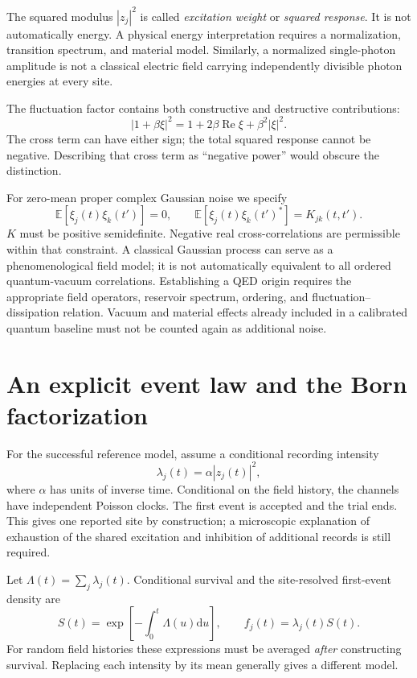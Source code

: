 \documentclass[11pt]{article}
\newcommand{\E}{\mathbb E}
\newcommand{\dd}{\mathrm d}
\begin{document}
The squared modulus $|z_j|^2$ is called \emph{excitation weight} or \emph{squared response}. It is not automatically energy. A physical energy interpretation requires a normalization, transition spectrum, and material model. Similarly, a normalized single-photon amplitude is not a classical electric field carrying independently divisible photon energies at every site.

The fluctuation factor contains both constructive and destructive contributions:
\begin{equation}
 |1+\beta\xi|^2=1+2\beta\operatorname{Re}\xi+\beta^2|\xi|^2.
\end{equation}
The cross term can have either sign; the total squared response cannot be negative. Describing that cross term as ``negative power'' would obscure the distinction.

For zero-mean proper complex Gaussian noise we specify
\begin{equation}
 \E[\xi_j(t)\xi_k(t')]=0,\qquad
 \E[\xi_j(t)\xi_k(t')^*]=K_{jk}(t,t').
\end{equation}
$K$ must be positive semidefinite. Negative real cross-correlations are permissible within that constraint. A classical Gaussian process can serve as a phenomenological field model; it is not automatically equivalent to all ordered quantum-vacuum correlations. Establishing a QED origin requires the appropriate field operators, reservoir spectrum, ordering, and fluctuation--dissipation relation. Vacuum and material effects already included in a calibrated quantum baseline must not be counted again as additional noise.

\section{An explicit event law and the Born factorization}
For the successful reference model, assume a conditional recording intensity
\begin{equation}\label{eq:hazard}
 \lambda_j(t)=\alpha |z_j(t)|^2,
\end{equation}
where $\alpha$ has units of inverse time. Conditional on the field history, the channels have independent Poisson clocks. The first event is accepted and the trial ends. This gives one reported site by construction; a microscopic explanation of exhaustion of the shared excitation and inhibition of additional records is still required.

Let $\Lambda(t)=\sum_j\lambda_j(t)$. Conditional survival and the site-resolved first-event density are
\begin{equation}\label{eq:survival}
 S(t)=\exp\left[-\int_0^t\Lambda(u)\dd u\right],\qquad
 f_j(t)=\lambda_j(t)S(t).
\end{equation}
For random field histories these expressions must be averaged \emph{after} constructing survival. Replacing each intensity by its mean generally gives a different model.
\end{document}
